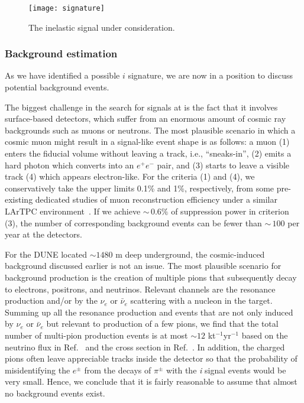 \begin{figure}[t]
\centering
\texttt{[image: signature]}
\caption{\label{fig:sig} The inelastic  signal under consideration.}
\end{figure}

\subsubsection{Background estimation}

As we have identified a possible $i$ signature, we are now in a position to discuss potential  background events. 

The biggest challenge in the search for  signals at  is the fact that it involves surface-based detectors, which suffer from an enormous amount of cosmic ray backgrounds such as muons or neutrons.
The most plausible scenario in which a cosmic muon might result in a signal-like event shape is as follows: a muon (1) enters the fiducial volume without leaving a track, i.e., ``sneaks-in'', (2) emits a hard photon which converts into an $e^+ e^-$ pair, and (3) starts to leave a visible track (4) which appears electron-like.
For the criteria (1) and (4), we conservatively take the upper limits 0.1\% and 1\%, respectively, from some pre-existing dedicated studies of muon reconstruction efficiency under a similar LArTPC %
environment~\cite{MicroBooNEmuon, Acciarri:2016sli}.
If we achieve $\sim\,0.6\%$ of suppression power in criterion (3), the number of corresponding background events can be fewer than $\sim\,100$ per year at the  detectors. 


For the DUNE  located $\sim 1480$ m deep underground, the cosmic-induced background discussed earlier is not an issue. 
The most plausible scenario for background production  is the creation of multiple pions that subsequently decay to electrons, positrons, and neutrinos. 
Relevant channels are the resonance production and/or  by the  $\nu_e$ or $\bar \nu_e$ scattering with a nucleon in the \lar target.
Summing up all the resonance production and  events that are not only induced by $\nu_e$ or $\bar \nu_e$ 
but relevant to production of a few pions, we find that the total number of multi-pion production events is at most $\sim 12$ kt$^{-1}$yr$^{-1}$ based on the neutrino flux in Ref.~\cite{Honda:2015fha} and the cross section in Ref.~\cite{Formaggio:2013kya}.
In addition, the charged pions often leave appreciable tracks inside the detector so that the probability of misidentifying the $e^\pm$ from the decays of $\pi^\pm$ with the \textit{i} signal events would be very small.
Hence, we conclude that it is fairly reasonable to assume that almost no background events exist.

